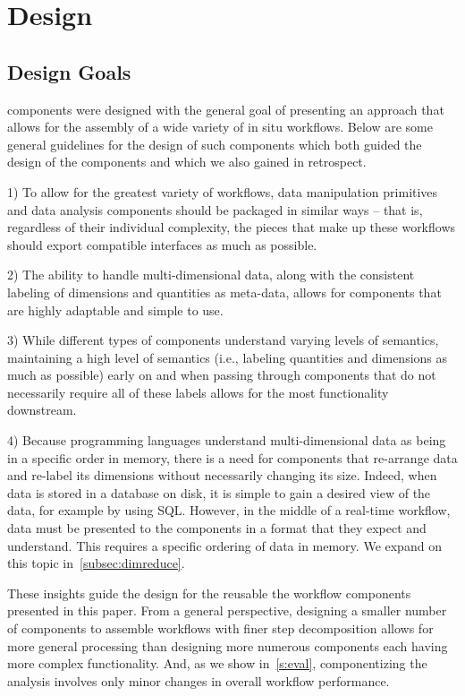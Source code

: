 \section{Design}
\label{s:design}

\subsection{Design Goals}
\label{subsec:design-goals}

\sys components were designed with the
general goal of presenting an approach
that allows for the assembly
of a wide variety of in situ workflows.
Below are some general guidelines
for the design of such components
which both guided the design of the \sys
components and which we also gained in retrospect.

1) To allow for the greatest variety of workflows,
data manipulation primitives and data analysis components
should be packaged in similar ways -- that is,
regardless of their individual complexity,
the pieces that make up these workflows
should export compatible interfaces as much as possible.

2) The ability to handle multi-dimensional data,
along with the consistent labeling of
dimensions and quantities as meta-data,
allows for components that are highly
adaptable and simple to use.

3) While different types of components understand
varying levels of semantics, maintaining a
high level of semantics (i.e., labeling
quantities and dimensions as much
as possible) early on and when passing
through components that do not necessarily
require all of these labels allows for the most
functionality downstream.

4) Because programming languages understand
multi-dimensional data as being in a
specific order in memory, there is a need for
components that re-arrange data and
re-label its dimensions without necessarily
changing its size. Indeed, when data is stored
in a database on disk, it is simple to gain a desired
view of the data, for example by using SQL.
However, in the middle of a real-time workflow,
data must be presented to the components in a
format that they expect and understand.
This requires a specific ordering of data in
memory. We expand on this topic in~\autoref{subsec:dimreduce}.

These insights guide the design for the
reusable the workflow
components presented in this
paper. From a general perspective, designing a smaller number of
components to assemble workflows with finer step decomposition
allows for more general processing
than designing more numerous components each having more
complex functionality.
And, as we show in~\autoref{s:eval}, componentizing
the analysis involves only minor changes
in overall workflow performance.

